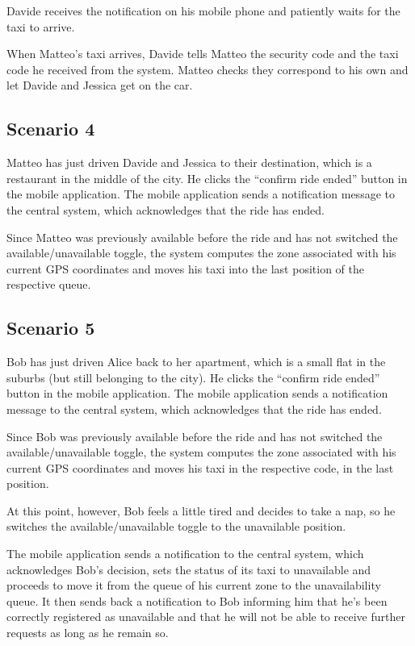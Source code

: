 Davide receives the notification on his mobile phone and patiently waits for the taxi to arrive.

When Matteo's taxi arrives, Davide tells Matteo the security code and the taxi code he received from the system. Matteo checks they correspond to his own and let Davide and Jessica get on the car.


\subsection{Scenario 4}
Matteo has just driven Davide and Jessica to their destination, which is a restaurant in the middle of the city. He clicks the ``confirm ride ended'' button in the mobile application. The mobile application sends a notification message to the central system, which acknowledges that the ride has ended.

Since Matteo was previously available before the ride and has not switched the available/unavailable toggle, the system computes the zone associated with his current GPS coordinates and moves his taxi into the last position of the respective queue.


\subsection{Scenario 5}
Bob has just driven Alice back to her apartment, which is a small flat in the suburbs (but still belonging to the city). He clicks the ``confirm ride ended'' button in the mobile application. The mobile application sends a notification message to the central system, which acknowledges that the ride has ended.

Since Bob was previously available before the ride and has not switched the available/unavailable toggle, the system computes the zone associated with his current GPS coordinates and moves his taxi in the respective code, in the last position.

At this point, however, Bob feels a little tired and decides to take a nap, so he switches the available/unavailable toggle to the unavailable position.

The mobile application sends a notification to the central system, which acknowledges Bob's decision, sets the status of its taxi to unavailable and proceeds to move it from the queue of his current zone to the unavailability queue. It then sends back a notification to Bob informing him that he's been correctly registered as unavailable and that he will not be able to receive further requests as long as he remain so.

